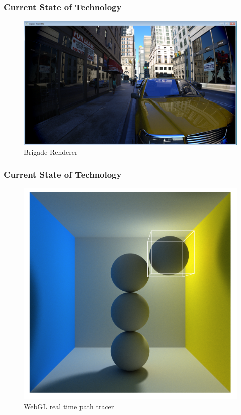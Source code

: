 \documentclass{beamer}
\begin{document}
\begin{frame}
    \frametitle{Current State of Technology}
    \begin{figure}[H]
        \includegraphics[scale=0.3]{brigade}
        \centering
        \caption{Brigade Renderer}
    \end{figure}
\end{frame}

\begin{frame}
    \frametitle{Current State of Technology}
    \begin{figure}[H]
        \includegraphics[scale=0.3]{webgl-pathtracer}
        \centering
        \caption{WebGL real time path tracer}
    \end{figure}
\end{frame}
\end{document}
